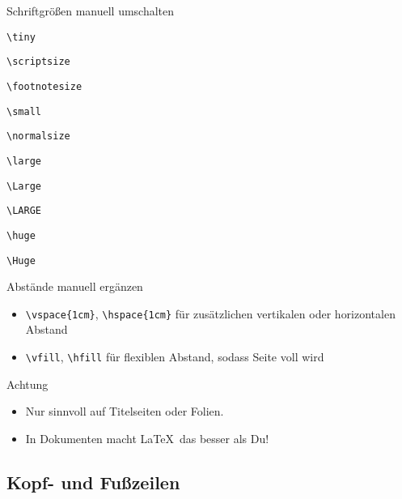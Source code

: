 \begin{frame}[fragile]{Schriftgrößen manuell umschalten}
  \begin{center}
    \tiny \lstinline-\tiny-

    \scriptsize \lstinline-\scriptsize-

    \footnotesize \lstinline-\footnotesize-

    \small \lstinline-\small-

    \normalsize \lstinline-\normalsize-

    \large \lstinline-\large-

    \Large \lstinline-\Large-

    \LARGE \lstinline-\LARGE-

    \huge \lstinline-\huge-

    \Huge \lstinline-\Huge-
  \end{center}

  \normalsize
\end{frame}

\begin{frame}[fragile]{Abstände manuell ergänzen}
  \begin{itemize}
    \item \lstinline-\vspace{1cm}-, \lstinline-\hspace{1cm}-\newline
      für zusätzlichen \alert{v}ertikalen oder \alert{h}orizontalen Abstand
    \item \lstinline-\vfill-, \lstinline-\hfill-\newline
      für flexiblen Abstand, sodass Seite voll wird
  \end{itemize}

  \xxx

  \begin{alertblock}{Achtung}
    \begin{itemize}
      \item Nur sinnvoll auf Titelseiten oder Folien.
      \item In Dokumenten macht \LaTeX\ das besser als Du!
    \end{itemize}
  \end{alertblock}
\end{frame}


\subsection{Kopf- und Fußzeilen}

